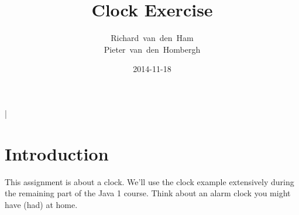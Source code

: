 
\title{Clock Exercise}
\author{Richard~van~den~Ham\\Pieter~van~den~Hombergh}
\def\Sep{\vspace{-\baselineskip}\hrulefill\vspace{-.5\baselineskip}}
\date{2014-11-18}
\lstMakeShortInline|
\lstset{language=Java}

\maketitle
\section*{Introduction}
This assignment is about a clock. We’ll use the clock example
extensively during the remaining part of the Java 1 course. Think about
an alarm clock you might have (had) at home.

